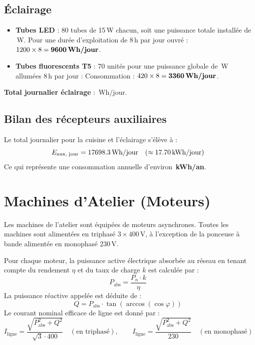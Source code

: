 \documentclass[11pt,a4paper]{article}
\begin{document}
\subsection{Éclairage}
\begin{itemize}
    \item \textbf{Tubes LED} : 80 tubes de 15\,W chacun, soit une puissance totale installée de \ValPLED\,W.
    Pour une durée d'exploitation de 8\,h par jour ouvré : $1200 \times 8 = \textbf{9600\,Wh/jour}$.
    \item \textbf{Tubes fluorescents T5} : 70 unités pour une puissance globale de \ValPFluo\,W allumées 8\,h par jour :
    Consommation : $420 \times 8 = \textbf{3360\,Wh/jour}$.
\end{itemize}
\textbf{Total journalier éclairage} : \ValEEclairageTotal\,Wh/jour.

\subsection{Bilan des récepteurs auxiliaires}
Le total journalier pour la cuisine et l'éclairage s'élève à :
\begin{equation}
    E_{\text{aux, jour}} = 17698.3\,\text{Wh/jour} \quad (\approx 17.70\,\text{kWh/jour})
\end{equation}
Ce qui représente une consommation annuelle d'environ \textbf{\ValETotalAuxAnKWh\,kWh/an}.

\section{Machines d'Atelier (Moteurs)}
Les machines de l'atelier sont équipées de moteurs asynchrones. Toutes les machines sont alimentées en triphasé $3 \times 400$\,V, à l'exception de la ponceuse à bande alimentée en monophasé 230\,V. 

Pour chaque moteur, la puissance active électrique absorbée au réseau en tenant compte du rendement $\eta$ et du taux de charge $k$ est calculée par :
\begin{equation}
    P_{\text{abs}} = \frac{P_n \cdot k}{\eta}
\end{equation}
La puissance réactive appelée est déduite de :
\begin{equation}
    Q = P_{\text{abs}} \cdot \tan(\arccos(\cos\varphi))
\end{equation}
Le courant nominal efficace de ligne est donné par :
\begin{equation}
    I_{\text{ligne}} = \frac{\sqrt{P_{\text{abs}}^2 + Q^2}}{\sqrt{3} \cdot 400} \quad (\text{en triphasé}), \qquad I_{\text{ligne}} = \frac{\sqrt{P_{\text{abs}}^2 + Q^2}}{230} \quad (\text{en monophasé})
\end{equation}
\end{document}
